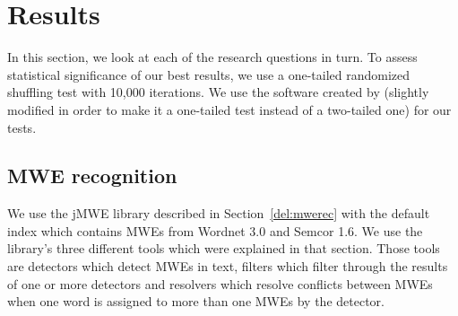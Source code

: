 \documentclass[output=paper]{langsci/langscibook}
\begin{document}
\section{Results}\label{del:exp}
In this section, we look at each of the research questions in turn.
%
To assess statistical significance of our best results, we use a one-tailed randomized shuffling test with 10,000 iterations. We use the software created by \citet{sigf06} (slightly modified in order to make it a one-tailed test instead of a two-tailed one) for our tests.


\subsection{MWE recognition}
\label{del:expmwerec}
\indent We use the jMWE library described in Section~\ref{del:mwerec} with the default index which contains MWEs from Wordnet 3.0 and Semcor 1.6. We use the library's three different tools which were explained in that section. Those tools are detectors which detect MWEs in text, filters which filter through the results of one or more detectors and resolvers which resolve conflicts between MWEs when one word is assigned to more than one MWEs by the detector.
\end{document}
